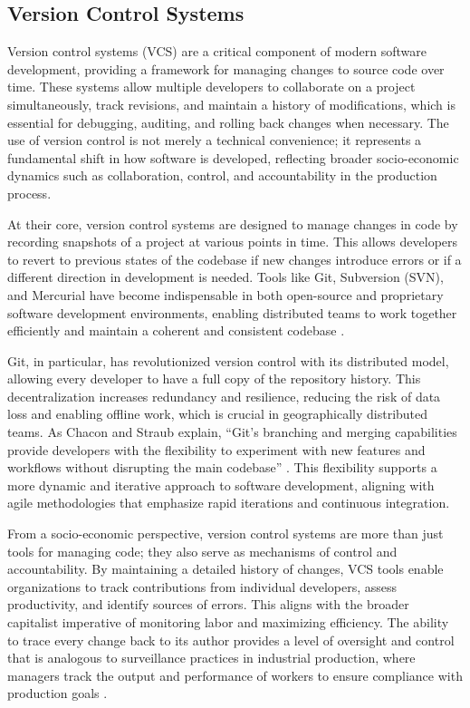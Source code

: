 \begin{refsection}
\subsection{Version Control Systems}

Version control systems (VCS) are a critical component of modern software development, providing a framework for managing changes to source code over time. These systems allow multiple developers to collaborate on a project simultaneously, track revisions, and maintain a history of modifications, which is essential for debugging, auditing, and rolling back changes when necessary. The use of version control is not merely a technical convenience; it represents a fundamental shift in how software is developed, reflecting broader socio-economic dynamics such as collaboration, control, and accountability in the production process.

At their core, version control systems are designed to manage changes in code by recording snapshots of a project at various points in time. This allows developers to revert to previous states of the codebase if new changes introduce errors or if a different direction in development is needed. Tools like Git, Subversion (SVN), and Mercurial have become indispensable in both open-source and proprietary software development environments, enabling distributed teams to work together efficiently and maintain a coherent and consistent codebase \cite[pp.~112-115]{Chacon2014}.

Git, in particular, has revolutionized version control with its distributed model, allowing every developer to have a full copy of the repository history. This decentralization increases redundancy and resilience, reducing the risk of data loss and enabling offline work, which is crucial in geographically distributed teams. As Chacon and Straub explain, “Git’s branching and merging capabilities provide developers with the flexibility to experiment with new features and workflows without disrupting the main codebase” \cite[pp.~140-143]{Chacon2014}. This flexibility supports a more dynamic and iterative approach to software development, aligning with agile methodologies that emphasize rapid iterations and continuous integration.

From a socio-economic perspective, version control systems are more than just tools for managing code; they also serve as mechanisms of control and accountability. By maintaining a detailed history of changes, VCS tools enable organizations to track contributions from individual developers, assess productivity, and identify sources of errors. This aligns with the broader capitalist imperative of monitoring labor and maximizing efficiency. The ability to trace every change back to its author provides a level of oversight and control that is analogous to surveillance practices in industrial production, where managers track the output and performance of workers to ensure compliance with production goals \cite[pp.~85-88]{Pressman2019}.


\end{refsection}
